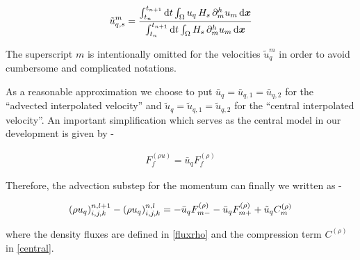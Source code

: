 

\begin{align}
	\tilde u_{q,s}^{m} = \frac{\int_{t_n}^{t_{n+1}} {\textrm{d}}t \int_{\Omega} u_q \, H_s \,  
	\partial_{m}^h u_m   \,  {\textrm{d}}\boldsymbol{x}}
	{\int_{t_n}^{t_{n+1}} {\textrm{d}}t \int_{\Omega} H_s \, \partial_{m}^h u_m \,{\textrm{d}}\boldsymbol{x}} 
\label{tildeudef}
\end{align}


The superscript $m$ is intentionally omitted  
for the velocities $\tilde u_q^m$ in order to avoid
cumbersome and complicated notations. 


As a reasonable approximation we choose to put 
$\bar u_q =  \bar u_{q,1} = \bar u_{q,2}$ for the 
``advected interpolated velocity'' and 
$\tilde u_q =  \tilde u_{q,1} = \tilde u_{q,2}$
for the ``central interpolated  velocity''. 
An important simplification which serves as  
the central model in our development is given by -  



\begin{align}
 F^{(\rho u)}_{f} = \bar u_q F^{(\rho)}_{f} \label{frou}
\end{align}


Therefore, the advection substep for the momentum can finally we written as -   


\begin{align}
{(\rho u_{q})_{i,j,k}^{n,l+1} - (\rho u_{q})_{i,j,k}^{n,l}} =  -\bar u_q  F^{(\rho)}_{m-} - \bar u_q  F^{(\rho)}_{m+} 
+ \tilde u_q C_m^{(\rho)}
\label{sumfmom2}
\end{align}


where the density fluxes are defined in \eqref{fluxrho} and the compression term 
$C^{(\rho)}$ in \eqref{central}. 



